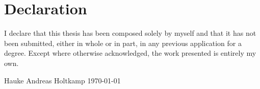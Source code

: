 \chapter*{Declaration}
\vspace*{2\baselineskip}
I declare that this thesis has been composed 
solely by myself and that it has not been submitted, either in whole or
in part, in any previous application for a degree.
Except where otherwise acknowledged, the work presented is entirely my
own.
\vspace{6\baselineskip}\\
\begin{flushright}
\hspace*{\fill}
Hauke Andreas Holtkamp
\newline
{}
\mydate\today
\end{flushright}


\cleardoublepage
